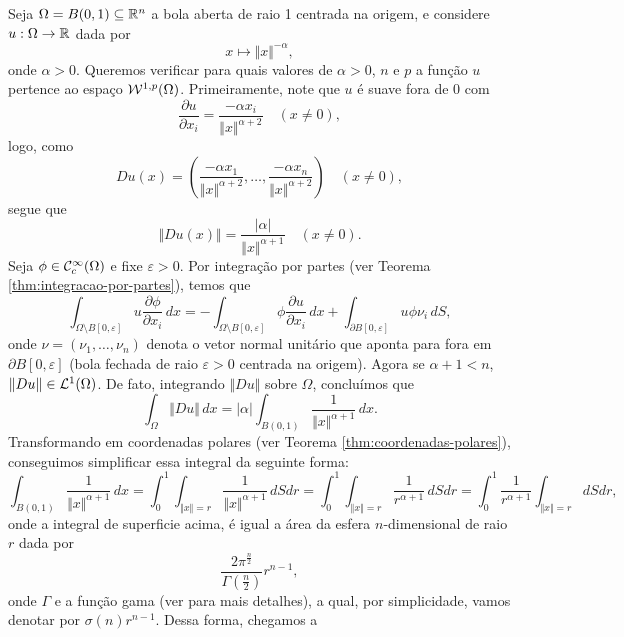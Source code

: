 \begin{ex}
    Seja $\Omega = B(0,1) \subseteq \mathbb{R}^n$ a bola aberta de raio 1 centrada na origem, e considere $u : \Omega \to \mathbb{R}$ dada por
    \begin{equation} \label{eq:po}
        x \mapsto \Vert x \Vert^{-\alpha},
    \end{equation}
    onde $\alpha > 0$. Queremos verificar para quais valores de $\alpha > 0$, $n$ e $p$ a função $u$ pertence ao espaço $\mathcal{W}^{1,p}(\Omega)$.
    Primeiramente, note que $u$ é suave fora de $0$ com
    \[
        \dfrac{\partial u}{\partial x_i} = \frac{-\alpha x_i}{\Vert x \Vert^{\alpha + 2}} \quad (x \neq 0),
    \]
    logo, como
    \[
        Du(x) = \left(\frac{-\alpha x_1}{\Vert x \Vert^{\alpha + 2}},\dots,\frac{-\alpha x_n}{\Vert x \Vert^{\alpha + 2}}  \right) \quad (x \neq 0),
    \]
    segue que
    \[
        \Vert Du(x) \Vert = \frac{|\alpha|}{\Vert x \Vert^{\alpha + 1}} \quad (x \neq 0).
    \]
    Seja $\phi \in \mathcal{C}^\infty_c(\Omega)$ e fixe $\varepsilon > 0$. Por integração por partes (ver Teorema \ref{thm:integracao-por-partes}), temos que
    \begin{equation} \label{eq:op}
        \int_{\Omega \setminus B[0, \varepsilon]} u \dfrac{\partial \phi}{\partial x_i} \, dx = -\int_{\Omega \setminus B[0, \varepsilon]} \phi \dfrac{\partial u}{\partial x_i} \,dx + \int_{\partial B[0,\varepsilon]} u \phi \nu_i \,dS,
    \end{equation}
    onde $\nu = (\nu_1,\dots,\nu_n)$ denota o vetor normal unitário que aponta para fora em $\partial B[0,\varepsilon]$ (bola fechada de raio $\varepsilon > 0  $ centrada na origem).
    Agora se $\alpha + 1 < n$, $\Vert Du \Vert \in \mathcal{L}^1(\Omega)$.
    De fato, integrando $\Vert Du \Vert$ sobre $\Omega$, concluímos que
    \[
        \int_\Omega \Vert Du \Vert \,dx = |\alpha|\int_{B(0,1)} \frac{1}{\Vert x \Vert^{\alpha+1}} \,dx.
    \]
    Transformando em coordenadas polares (ver Teorema \ref{thm:coordenadas-polares}), conseguimos simplificar essa integral da seguinte forma:
    \[
        \int_{B(0,1)} \frac{1}{\Vert x \Vert^{\alpha+1}} \,dx =  \int_0^1 \int_{\Vert x \Vert = r} \frac{1}{\Vert x \Vert^{\alpha + 1}} \,dS dr = \int_0^1 \int_{\Vert x \Vert= r} \frac{1}{r^{\alpha + 1}} \, dS dr = \int_0^1 \frac{1}{r^{\alpha+1}}  \int_{\Vert x \Vert = r} dS dr,
    \]
    onde a integral de superficie acima, é igual a área da esfera $n$-dimensional de raio $r$ dada por
    \[
        \frac{2\pi^{\frac{n}{2}}}{\Gamma(\frac{n}{2})}r^{n-1},
    \]
    onde $\Gamma$ e a função gama (ver \cite{artin-gamma} para mais detalhes), a qual, por simplicidade, vamos denotar por $\sigma(n) r^{n-1}$. Dessa forma, chegamos a

\end{ex}
